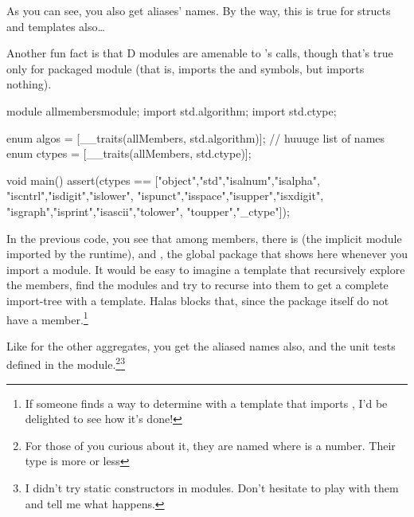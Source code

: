 As you can see, you also get aliases' names. By the way, this is true for structs and templates also\ldots

Another fun fact is that D modules are amenable to 's calls, though that's true only for packaged module (that is,  imports the  and  symbols, but  imports nothing).

\begin{dcode}
module allmembersmodule;
import std.algorithm;
import std.ctype;

enum algos = [__traits(allMembers, std.algorithm)]; // huuuge list of names
enum ctypes = [__traits(allMembers, std.ctype)];

void main()
{
    assert(ctypes == ["object","std","isalnum","isalpha",
                      "iscntrl","isdigit","islower",
                      "ispunct","isspace","isupper","isxdigit",
                      "isgraph","isprint","isascii","tolower",
                      "toupper","_ctype"]);
}
\end{dcode}

In the previous code, you see that among  members, there is  (the implicit  module imported by the runtime), and , the global package that shows here whenever you import a  module. It would be easy to imagine a template that recursively explore the members, find the modules and try to recurse into them to get a complete import-tree with a template. Halas  blocks that, since the package itself do not have a member.\footnote{ If someone finds a way to determine with a template that  imports , I'd be delighted to see how it's done!}


Like for the other aggregates, you get the aliased names also, and the unit tests defined in the module.\footnote{ For those of you curious about it, they are named  where  is a number. Their type is more or less \DD{()}}\footnote{ I didn't try static constructors in modules. Don't hesitate to play with them and tell me what happens.}


